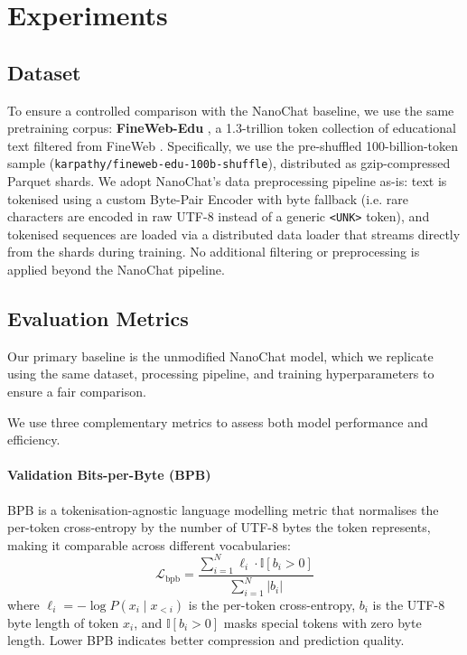\section{Experiments}

\subsection{Dataset}

To ensure a controlled comparison with the NanoChat baseline, we use the same pretraining corpus:
\textbf{FineWeb-Edu} \parencite{finewebedu}, a 1.3-trillion token collection of educational text
filtered from FineWeb \parencite{penedo2024fineweb}.
Specifically, we use the pre-shuffled 100-billion-token sample
(\texttt{karpathy/fineweb-edu-100b-shuffle}), distributed as gzip-compressed Parquet shards.
We adopt NanoChat's data preprocessing pipeline as-is: text is tokenised using a custom
Byte-Pair Encoder with byte fallback (i.e. rare characters are encoded in raw UTF-8 instead of a generic \texttt{<UNK>} token), and tokenised sequences are loaded via a distributed data loader that streams directly from the shards during training.
No additional filtering or preprocessing is applied beyond the NanoChat pipeline.

\subsection{Evaluation Metrics}

Our primary baseline is the unmodified NanoChat model, which we replicate using the same dataset, processing pipeline, and training hyperparameters to ensure a fair comparison.

We use three complementary metrics to assess both model performance and efficiency.

\paragraph{Validation Bits-per-Byte (BPB)}
BPB is a tokenisation-agnostic language modelling metric that normalises the per-token
cross-entropy by the number of UTF-8 bytes the token represents, making it comparable across
different vocabularies:
\begin{equation*}
    \mathcal{L}_{\text{bpb}} = \frac{\sum_{i=1}^{N} \ell_i \cdot \mathbb{I}[b_i > 0]}
                                    {\sum_{i=1}^{N} |b_i|}
\end{equation*}
where $\ell_i = -\log P(x_i \mid x_{<i})$ is the per-token cross-entropy, $b_i$ is the UTF-8
byte length of token $x_i$, and $\mathbb{I}[b_i > 0]$ masks special tokens with zero byte
length.
Lower BPB indicates better compression and prediction quality.

